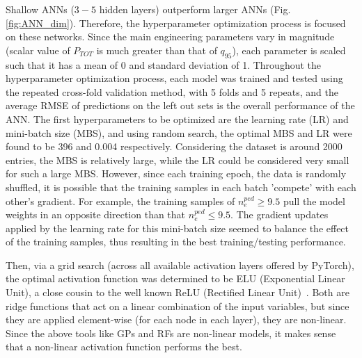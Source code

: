 \documentclass[a4paper, twoside, final, 12pt]{article}
\begin{document}
{Shallow ANNs ($3-5$ hidden layers) outperform larger ANNs (Fig. \ref{fig:ANN_dim}). Therefore, the hyperparameter optimization process is focused on these networks. Since the main engineering parameters vary in magnitude (scalar value of $P_{TOT}$ is much greater than that of $q_{95}$), each parameter is scaled such that it has a mean of 0 and standard deviation of 1. Throughout the hyperparameter optimization process, each model was trained and tested using the repeated cross-fold validation method, with 5 folds and 5 repeats, and the average RMSE of predictions on the left out sets is the overall performance of the ANN. The first hyperparameters to be optimized are the learning rate (LR) and mini-batch size (MBS), and using random search, the optimal MBS and LR were found to be 396 and 0.004 respectively. Considering the dataset is around 2000 entries, the MBS is relatively large, while the LR could be considered very small for such a large MBS. However, since each training epoch, the data is randomly shuffled, it is possible that the training samples in each batch 'compete' with each other's gradient. For example, the training samples of $n_e^{ped} \geq 9.5$ pull the model weights in an opposite direction than that $n_e^{ped} \leq 9.5$. The gradient updates applied by the learning rate for this mini-batch size seemed to balance the effect of the training samples, thus resulting in the best training/testing performance. 

Then, via a grid search (across all available activation layers offered by PyTorch), the optimal activation function was determined to be ELU (Exponential Linear Unit), a close cousin to the well known ReLU (Rectified Linear Unit)~\cite{pytorch_act}. Both are ridge functions that act on a linear combination of the input variables, but since they are applied element-wise (for each node in each layer), they are non-linear. Since the above tools like GPs and RFs are non-linear models, it makes sense that a non-linear activation function performs the best. 

}
\end{document}
